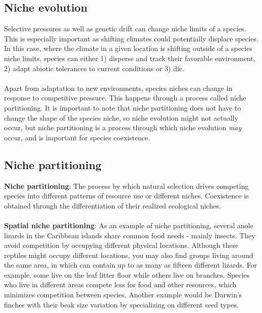 \documentclass[12pt]{article}
\begin{document}
\subsection*{Niche evolution}

Selective pressures as well as genetic drift can change niche limits of a species. This is especially important as shifting climates could potentially displace species. In this case, where the climate in a given location is shifting outside of a species niche limits, species can either 1) disperse and track their favorable environment, 2) adapt abiotic tolerances to current conditions or 3) die. 



\paragraph*{}
Apart from adaptation to new environments, species niches can change in response to competitive pressure. This happens through a process called niche partitioning. It is important to note that niche partitioning does not have to change the shape of the species niche, so niche evolution might not actually occur, but niche partitioning is a process through which niche evolution \textit{may} occur, and is important for species coexistence. 



\subsection*{Niche partitioning}
\textbf{Niche partitioning}: The process by which natural selection drives competing species into different patterns of resource use or different niches. Coexistence is obtained through the differentiation of their realized ecological niches. 



\paragraph*{}
\textbf{Spatial niche partitioning}: As an example of niche partitioning, several anole lizards in the Caribbean islands share common food needs - mainly insects. They avoid competition by occupying different physical locations. Although these reptiles might occupy different locations, you may also find groups living around the same area, in which can contain up to as many as fifteen different lizards. For example, some live on the leaf litter floor while others live on branches. Species who live in different areas compete less for food and other resources, which minimizes competition between species. Another example would be Darwin's finches with their beak size variation by specializing on different seed types.
\end{document}
